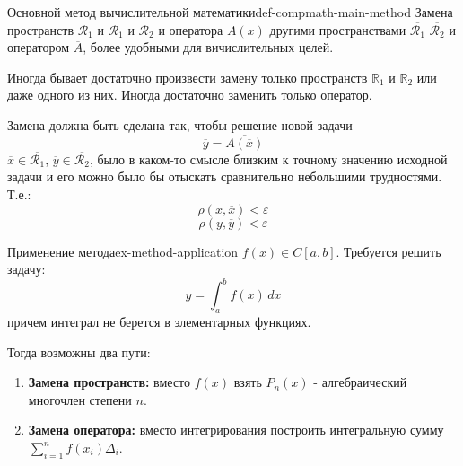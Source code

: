 \documentclass[14pt]{extarticle}
\begin{document}
        \begin{definition}{Основной метод вычислительной математики}{def-compmath-main-method}
            Замена пространств $\mathscr{R}_{1}$ и $\mathscr{R}_{1}$ и $\mathscr{R}_{2}$ и оператора $A(x)$ другими пространствами $\overline{\mathscr{R}_{1}}$ $\overline{\mathscr{R}_{2}}$ и оператором $\overline{A}$, более удобными для вичислительных целей.

            \vspace{\baselineskip}

            Иногда бывает достаточно произвести замену только пространств $\mathbb{R}_{1}$ и $\mathbb{R}_{2}$ или даже одного из них. Иногда достаточно заменить только оператор.

            \vspace{\baselineskip}

            Замена должна быть сделана так, чтобы решение новой задачи
            $$\overline{y} = \overline{A(\overline{x})}$$
            $\overline{x} \in \overline{\mathscr{R_{1}}}$, $\overline{y} \in \overline{\mathscr{R_{2}}}$, было в каком-то смысле близким к точному значению исходной задачи и его можно было бы отыскать сравнительно небольшими трудностями.\\
            Т.е.:
            $$\rho(x, \overline{x}) < \varepsilon$$
            $$\rho(y, \overline{y}) < \varepsilon$$
        \end{definition}

        \begin{example}{Применение метода}{ex-method-application}
            $f(x) \in C[a, b]$. Требуется решить задачу:
            $$y = \int_{a}^{b} f(x) \, dx$$
            причем интеграл не берется в элементарных функциях.

            \vspace{\baselineskip}

            Тогда возможны два пути:
            \begin{enumerate}
                \item \textbf{Замена пространств:} вместо $f(x)$ взять $P_{n}(x)$ - алгебраический многочлен степени $n$.
                \item \textbf{Замена оператора:} вместо интегрирования построить интегральную сумму $\sum_{i=1}^{n}f(x_{i})\Delta_{i}$.
            \end{enumerate}
        \end{example}
\end{document}
